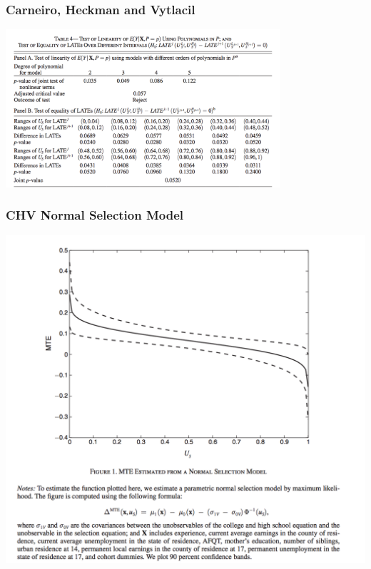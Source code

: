 \begin{frame}
  \frametitle{Carneiro, Heckman and Vytlacil}
  \begin{center}
  \includegraphics[width=4in]{./resources/chv_tab4}
  \end{center}
\end{frame}

\begin{frame}
\frametitle{CHV Normal Selection Model}
\vspace{-10pt}
\begin{center}
\includegraphics[width= \textwidth]{./resources/chv_fig1}
\end{center}
\end{frame}



